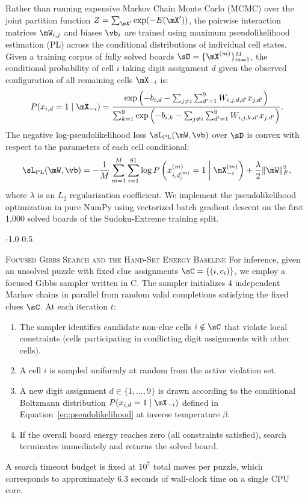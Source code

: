 \documentclass{article} %
\makeatletter
\renewcommand{\subsection}{\@startsection{subsection}{2}{\z@}%
  {-1.0\baselineskip}%
  {0.5\baselineskip}%
  {\normalfont\fontsize{10}{11}\selectfont\raggedright\scshape}}
\makeatother
\begin{document}
Rather than running expensive Markov Chain Monte Carlo (MCMC) over the joint partition function $Z = \sum_{\mX'} \exp(-E(\mX'))$, the pairwise interaction matrices $\mW_{i,j}$ and biases $\vb_i$ are trained using maximum pseudolikelihood estimation (PL) across the conditional distributions of individual cell states. Given a training corpus of fully solved boards $\sD = \{\mX^{(m)}\}_{m=1}^M$, the conditional probability of cell $i$ taking digit assignment $d$ given the observed configuration of all remaining cells $\mX_{-i}$ is:
\begin{equation}
P(x_{i,d} = 1 \mid \mX_{-i}) = \frac{\exp\left( - b_{i,d} - \sum_{j \neq i} \sum_{d'=1}^9 W_{i,j,d,d'} x_{j,d'} \right)}{\sum_{k=1}^9 \exp\left( - b_{i,k} - \sum_{j \neq i} \sum_{d'=1}^9 W_{i,j,k,d'} x_{j,d'} \right)}.
\label{eq:pseudolikelihood}
\end{equation}
The negative log-pseudolikelihood loss $\sL_{\text{PL}}(\mW, \vb)$ over $\sD$ is convex with respect to the parameters of each cell conditional:
\begin{equation}
\sL_{\text{PL}}(\mW, \vb) = - \frac{1}{M} \sum_{m=1}^M \sum_{i=1}^{81} \log P\left(x_{i, d_i^{(m)}}^{(m)} = 1 \;\middle|\; \mX_{-i}^{(m)}\right) + \frac{\lambda}{2} \|\mW\|_F^2,
\label{eq:loss}
\end{equation}
where $\lambda$ is an $L_2$ regularization coefficient. We implement the pseudolikelihood optimization in pure NumPy using vectorized batch gradient descent on the first 1,000 solved boards of the Sudoku-Extreme training split.

\subsection{\textsc{Focused Gibbs Search and the Hand-Set Energy Baseline}}
\label{sec:gibbs_search}
For inference, given an unsolved puzzle with fixed clue assignments $\sC = \{(i, c_i)\}$, we employ a focused Gibbs sampler written in C. The sampler initializes 4 independent Markov chains in parallel from random valid completions satisfying the fixed clues $\sC$. At each iteration $t$:
\begin{enumerate}
    \item The sampler identifies candidate non-clue cells $i \notin \sC$ that violate local constraints (cells participating in conflicting digit assignments with other cells).
    \item A cell $i$ is sampled uniformly at random from the active violation set.
    \item A new digit assignment $d \in \{1, \dots, 9\}$ is drawn according to the conditional Boltzmann distribution $P(x_{i,d} = 1 \mid \mX_{-i})$ defined in Equation~\ref{eq:pseudolikelihood} at inverse temperature $\beta$.
    \item If the overall board energy reaches zero (all constraints satisfied), search terminates immediately and returns the solved board.
\end{enumerate}
A search timeout budget is fixed at $10^7$ total moves per puzzle, which corresponds to approximately 6.3 seconds of wall-clock time on a single CPU core.
\end{document}
